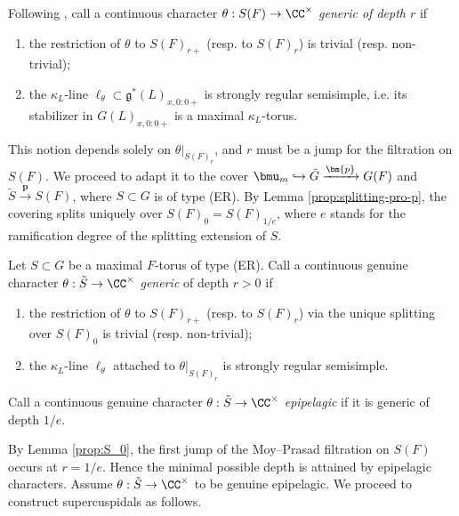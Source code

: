 \documentclass[a4paper,10pt]{article}
\begin{document}
Following \cite{Kal15}, call a continuous character $\theta: S(F) \to \CC^\times$ \emph{generic of depth $r$} if
\begin{enumerate}
	\item the restriction of $\theta$ to $S(F)_{r+}$ (resp. to $S(F)_r$) is trivial (resp. non-trivial);
	\item the $\kappa_L$-line $\ell_\theta \subset \mathfrak{g}^*(L)_{x,0:0+}$ is strongly regular semisimple, i.e. its stabilizer in $G(L)_{x, 0:0+}$ is a maximal $\kappa_L$-torus.
\end{enumerate}
This notion depends solely on $\theta|_{S(F)_r}$, and $r$ must be a jump for the filtration on $S(F)$. We proceed to adapt it to the cover $\bmu_m \hookrightarrow \tilde{G} \xrightarrow{\bm{p}} G(F)$ and $\tilde{S} \xrightarrow{\bm{p}} S(F)$, where $S \subset G$ is of type (ER). By Lemma \ref{prop:splitting-pro-p}, the covering splits uniquely over $S(F)_0 = S(F)_{1/e}$, where $e$ stands for the ramification degree of the splitting extension of $S$.

\begin{definition}\label{def:epipelagic-character}
	Let $S \subset G$ be a maximal $F$-torus of type (ER). Call a continuous genuine character $\theta: \tilde{S} \to \CC^\times$ \emph{generic} of depth $r > 0$ if
	\begin{enumerate}
		\item the restriction of $\theta$ to $S(F)_{r+}$ (resp. to $S(F)_r$) via the unique splitting over $S(F)_0$ is trivial (resp. non-trivial);
		\item the $\kappa_L$-line $\ell_\theta$ attached to $\theta|_{S(F)_r}$ is strongly regular semisimple.
	\end{enumerate}
	Call a continuous genuine character $\theta: \tilde{S} \to \CC^\times$ \emph{epipelagic} if it is generic of depth $1/e$.
\end{definition}
By Lemma \ref{prop:S_0}, the first jump of the Moy--Prasad filtration on $S(F)$ occurs at $r=1/e$. Hence the minimal possible depth is attained by epipelagic characters. Assume $\theta: \tilde{S} \to \CC^\times$ to be genuine epipelagic. We proceed to construct supercuspidals as follows.
\end{document}
